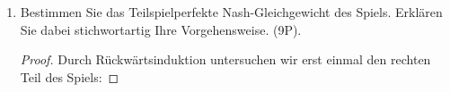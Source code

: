 \documentclass[12pt]{article}
\begin{document}
\begin{enumerate}[label=\alph*\upshape)]
\begin{proof}
		$$ \big( d, \text{ falls } L, c \text{ falls } (R, a), c \text{ falls } (R, b) \big), ~ \big( c, \text{ falls } L, d \text{ falls } (R, a), c \text{ falls } (R, b) \big), $$
		$$ \big( c, \text{ falls } L, c \text{ falls } (R, a), d \text{ falls } (R, b) \big), ~ \big( d, \text{ falls } L, d \text{ falls } (R, a), c \text{ falls } (R, b) \big), $$
		$$  \big( d, \text{ falls } L, c \text{ falls } (R, a), d \text{ falls } (R, b) \big), ~ \big( c, \text{ falls } L, d \text{ falls } (R, a), d \text{ falls } (R, b) \big), ~  $$
		$$  \big( c, \text{ falls } L, c \text{ falls } (R, a), c \text{ falls } (R, b) \big), ~ \big( d, \text{ falls } L, d \text{ falls } (R, a), d \text{ falls } (R, b) \big)  $$
		\end{proof}
	\item Bestimmen Sie das Teilspielperfekte Nash-Gleichgewicht des Spiels. Erklären Sie dabei stichwortartig Ihre Vorgehensweise. (9P).
	\begin{proof}
		Durch Rückwärtsinduktion untersuchen wir erst einmal den rechten Teil des Spiels:
		

\end{proof}
\end{enumerate}
\end{document}
